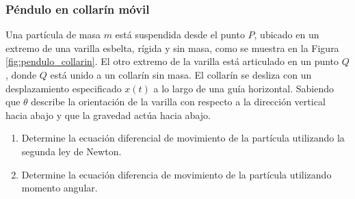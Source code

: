 \subsubsection{Péndulo en collarín móvil}

Una partícula de masa $m$ está suspendida desde el punto $P$, ubicado en un extremo de una varilla esbelta, rígida y sin masa, como se muestra en la Figura \ref{fig:pendulo_collarin}. El otro extremo de la varilla está articulado en un punto $Q$, donde $Q$ está unido a un collarín sin masa. El collarín se desliza con un desplazamiento especificado $x(t)$ a lo largo de una guía horizontal. Sabiendo que $\theta$ describe la orientación de la varilla con respecto a la dirección vertical hacia abajo y que la gravedad actúa hacia abajo.

\begin{enumerate}
    \item Determine la ecuación diferencial de movimiento de la partícula utilizando la segunda ley de Newton.
    \item Determine la ecuación diferencia de movimiento de la partícula utilizando momento angular.
\end{enumerate}

